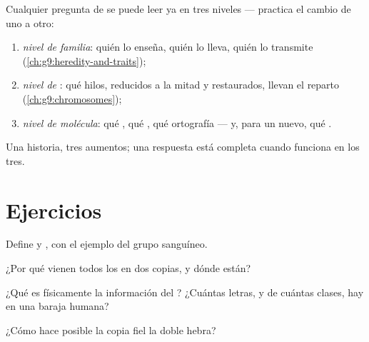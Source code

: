 \begin{method}\label{met:g9:genes-and-dna:levels}
Cualquier pregunta de  se puede leer ya en tres niveles ---
practica el cambio de uno a otro:
\begin{enumerate}
  \item \emph{nivel de familia}: quién lo enseña, quién lo lleva, quién
        lo transmite (\cref{ch:g9:heredity-and-traits});
  \item \emph{nivel de }: qué hilos, reducidos a la mitad y
        restaurados, llevan el reparto (\cref{ch:g9:chromosomes});
  \item \emph{nivel de molécula}: qué , qué , qué ortografía
        --- y, para un  nuevo, qué .
\end{enumerate}
Una historia, tres aumentos; una respuesta está completa cuando
funciona en los tres.
\end{method}

\section{Ejercicios}

\begin{exercise}[$\star$]\label{exo:g9:genes-and-dna:1}
Define  y , con el ejemplo del grupo sanguíneo.
\end{exercise}

\begin{exercise}[$\star$]\label{exo:g9:genes-and-dna:2}
¿Por qué vienen todos los  en dos copias, y dónde están?
\end{exercise}

\begin{exercise}[$\star$]\label{exo:g9:genes-and-dna:3}
¿Qué es físicamente la información del ? ¿Cuántas letras, y de
cuántas clases, hay en una baraja humana?
\end{exercise}

\begin{exercise}[$\star$]\label{exo:g9:genes-and-dna:4}
¿Cómo hace posible la copia fiel la doble hebra?
\end{exercise}


